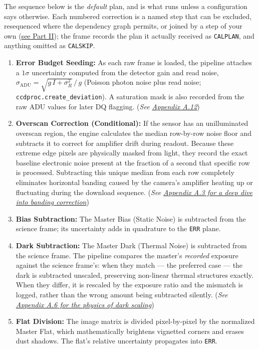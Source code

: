 \documentclass[11pt,a4paper]{article}
\begin{document}
The sequence below is the \emph{default} plan, and is what runs unless a
configuration says otherwise. Each numbered correction is a named step that can
be excluded, resequenced where the dependency graph permits, or joined by a step
of your own (\hyperref[sec:stepplan]{see Part II}); the frame records the plan it
actually received as \texttt{CALPLAN}, and anything omitted as \texttt{CALSKIP}.
\begin{enumerate}
    \item \textbf{Error Budget Seeding:} As each raw frame is loaded, the pipeline attaches a $1\sigma$ uncertainty computed from the detector gain and read noise, $\sigma_{\mathrm{ADU}} = \sqrt{g\,I + \sigma_R^2}\,/\,g$ (Poisson photon noise plus read noise; \texttt{ccdproc.create\_deviation}). A saturation mask is also recorded from the raw ADU values for later DQ flagging. (\textit{See \hyperref[app:errbudget]{Appendix A.12}})
    \item \textbf{Overscan Correction (Conditional):} If the sensor has an unilluminated overscan region, the engine calculates the median row-by-row noise floor and subtracts it to correct for amplifier drift during readout. Because these extreme edge pixels are physically masked from light, they record the exact baseline electronic noise present at the fraction of a second that specific row is processed. Subtracting this unique median from each row completely eliminates horizontal banding caused by the camera's amplifier heating up or fluctuating during the download sequence. (\textit{See \hyperref[app:overscan]{Appendix A.3 for a deep dive into banding correction}})
    \item \textbf{Bias Subtraction:} The Master Bias (Static Noise) is subtracted from the science frame; its uncertainty adds in quadrature to the \texttt{ERR} plane.
    \item \textbf{Dark Subtraction:} The Master Dark (Thermal Noise) is subtracted from the science frame. The pipeline compares the master's \emph{recorded} exposure against the science frame's: when they match --- the preferred case --- the dark is subtracted unscaled, preserving non-linear thermal structures exactly. When they differ, it is rescaled by the exposure ratio and the mismatch is logged, rather than the wrong amount being subtracted silently. (\textit{See \hyperref[app:dark]{Appendix A.6 for the physics of dark scaling}})
    \item \textbf{Flat Division:} The image matrix is divided pixel-by-pixel by the normalized Master Flat, which mathematically brightens vignetted corners and erases dust shadows. The flat's relative uncertainty propagates into \texttt{ERR}.

\end{enumerate}
\end{document}
